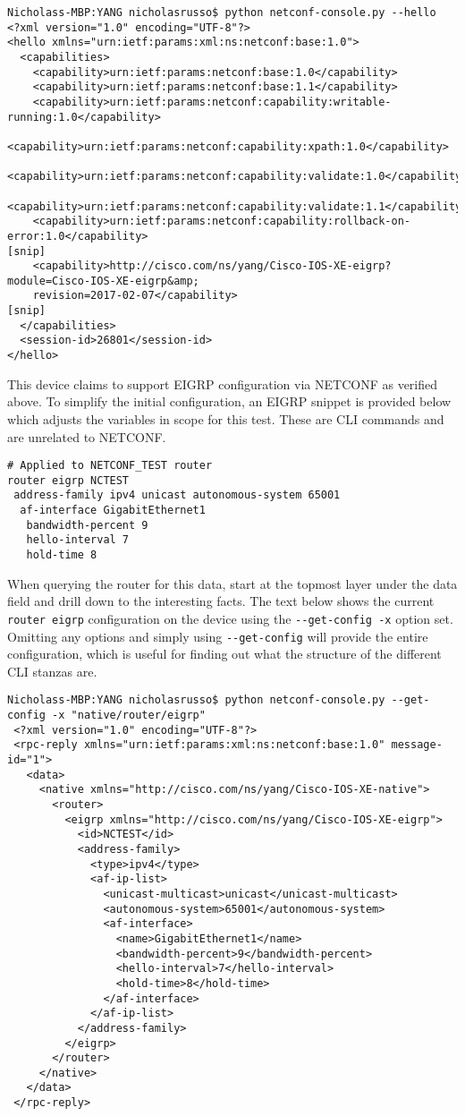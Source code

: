 \begin{verbatim}
Nicholass-MBP:YANG nicholasrusso$ python netconf-console.py --hello
<?xml version="1.0" encoding="UTF-8"?>
<hello xmlns="urn:ietf:params:xml:ns:netconf:base:1.0">
  <capabilities>
    <capability>urn:ietf:params:netconf:base:1.0</capability>
    <capability>urn:ietf:params:netconf:base:1.1</capability>
    <capability>urn:ietf:params:netconf:capability:writable-running:1.0</capability>
    <capability>urn:ietf:params:netconf:capability:xpath:1.0</capability>
    <capability>urn:ietf:params:netconf:capability:validate:1.0</capability>
    <capability>urn:ietf:params:netconf:capability:validate:1.1</capability>
    <capability>urn:ietf:params:netconf:capability:rollback-on-error:1.0</capability>
[snip]
    <capability>http://cisco.com/ns/yang/Cisco-IOS-XE-eigrp?module=Cisco-IOS-XE-eigrp&amp;
	revision=2017-02-07</capability>
[snip]
  </capabilities>
  <session-id>26801</session-id>
</hello>
\end{verbatim}

This device claims to support EIGRP configuration via NETCONF as verified
above. To simplify the initial configuration, an EIGRP snippet is provided
below which adjusts the variables in scope for this test. These are CLI
commands and are unrelated to NETCONF.

\begin{verbatim}
# Applied to NETCONF_TEST router
router eigrp NCTEST
 address-family ipv4 unicast autonomous-system 65001
  af-interface GigabitEthernet1
   bandwidth-percent 9
   hello-interval 7
   hold-time 8
\end{verbatim}

When querying the router for this data, start at the topmost layer under the
data field and drill down to the interesting facts. The text below shows the
current \verb|router eigrp| configuration on the device using the \verb|--get-config -x|
option set. Omitting any options and simply using \verb|--get-config| will provide
the entire configuration, which is useful for finding out what the structure
of the different CLI stanzas are.

\begin{verbatim}
Nicholass-MBP:YANG nicholasrusso$ python netconf-console.py --get-config -x "native/router/eigrp"
 <?xml version="1.0" encoding="UTF-8"?>
 <rpc-reply xmlns="urn:ietf:params:xml:ns:netconf:base:1.0" message-id="1">
   <data>
     <native xmlns="http://cisco.com/ns/yang/Cisco-IOS-XE-native">
       <router>
         <eigrp xmlns="http://cisco.com/ns/yang/Cisco-IOS-XE-eigrp">
           <id>NCTEST</id>
           <address-family>
             <type>ipv4</type>
             <af-ip-list>
               <unicast-multicast>unicast</unicast-multicast>
               <autonomous-system>65001</autonomous-system>
               <af-interface>
                 <name>GigabitEthernet1</name>
                 <bandwidth-percent>9</bandwidth-percent>
                 <hello-interval>7</hello-interval>
                 <hold-time>8</hold-time>
               </af-interface>
             </af-ip-list>
           </address-family>
         </eigrp>
       </router>
     </native>
   </data>
 </rpc-reply>
\end{verbatim}

